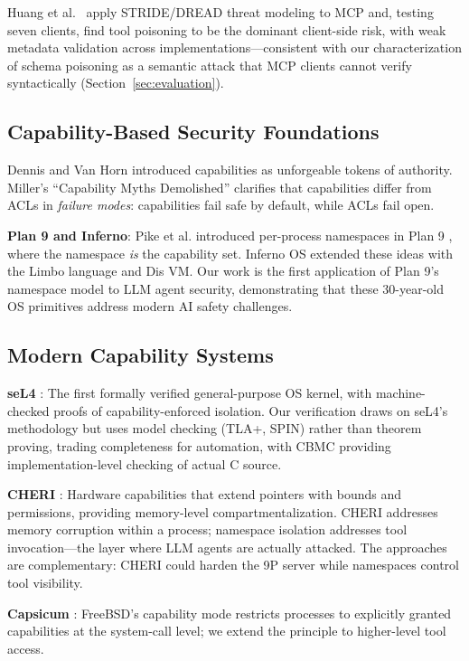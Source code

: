 \documentclass{article}
\begin{document}
Huang et al.\ \cite{huang2026mcpthreat} apply STRIDE/DREAD threat modeling to MCP and, testing seven clients, find tool poisoning to be the dominant client-side risk, with weak metadata validation across implementations---consistent with our characterization of schema poisoning as a semantic attack that MCP clients cannot verify syntactically (Section~\ref{sec:evaluation}).

\subsection{Capability-Based Security Foundations}

Dennis and Van Horn \cite{dennis1966capabilities} introduced capabilities as unforgeable tokens of authority. Miller's ``Capability Myths Demolished'' \cite{miller2006capability} clarifies that capabilities differ from ACLs in \textit{failure modes}: capabilities fail safe by default, while ACLs fail open.

\textbf{Plan 9 and Inferno}: Pike et al. introduced per-process namespaces in Plan 9 \cite{pike1990plan9}, where the namespace \textit{is} the capability set. Inferno OS \cite{dorward1997inferno} extended these ideas with the Limbo language and Dis VM. Our work is the first application of Plan 9's namespace model to LLM agent security, demonstrating that these 30-year-old OS primitives address modern AI safety challenges.

\subsection{Modern Capability Systems}

\textbf{seL4} \cite{klein2009sel4}: The first formally verified general-purpose OS kernel, with machine-checked proofs of capability-enforced isolation. Our verification draws on seL4's methodology but uses model checking (TLA+, SPIN) rather than theorem proving, trading completeness for automation, with CBMC providing implementation-level checking of actual C source.

\textbf{CHERI} \cite{woodruff2014cheri}: Hardware capabilities that extend pointers with bounds and permissions, providing memory-level compartmentalization. CHERI addresses memory corruption within a process; namespace isolation addresses tool invocation---the layer where LLM agents are actually attacked. The approaches are complementary: CHERI could harden the 9P server while namespaces control tool visibility.

\textbf{Capsicum} \cite{watson2010capsicum}: FreeBSD's capability mode restricts processes to explicitly granted capabilities at the system-call level; we extend the principle to higher-level tool access.
\end{document}
